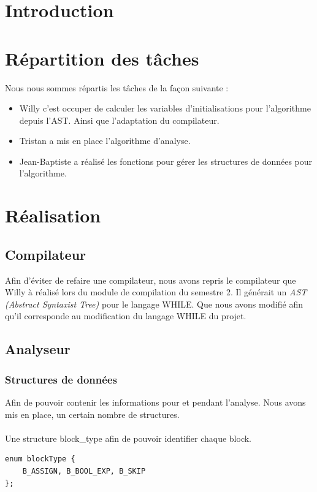 \documentclass[12pt,a4paper,oneside]{article}
\begin{document}
\tableofcontents

\newpage

\section{Introduction}

\section{Répartition des tâches}
Nous nous sommes répartis les tâches de la façon suivante :
\begin{itemize}
\item Willy c'est occuper de calculer les variables d'initialisations pour l'algorithme depuis l'AST. Ainsi que l'adaptation du compilateur.
\item Tristan a mis en place l'algorithme d'analyse.
\item Jean-Baptiste a réalisé les fonctions pour gérer les structures de données pour l'algorithme.
\end{itemize}

\section{Réalisation}
\subsection{Compilateur}
Afin d'éviter de refaire une compilateur, nous avons repris le compilateur que Willy à réalisé lors du module de compilation du semestre 2. Il générait un \emph{AST (Abstract Syntaxist Tree)} pour le langage WHILE. Que nous avons modifié afin qu'il corresponde au modification du langage WHILE du projet.

\subsection{Analyseur}

\subsubsection{Structures de données}
Afin de pouvoir contenir les informations pour et pendant l'analyse. Nous avons mis en place, un certain nombre de structures.

\paragraph{}
Une structure block\_type afin de pouvoir identifier chaque block.
\begin{lstlisting}
enum blockType {
	B_ASSIGN, B_BOOL_EXP, B_SKIP
};
\end{lstlisting}
\end{document}
